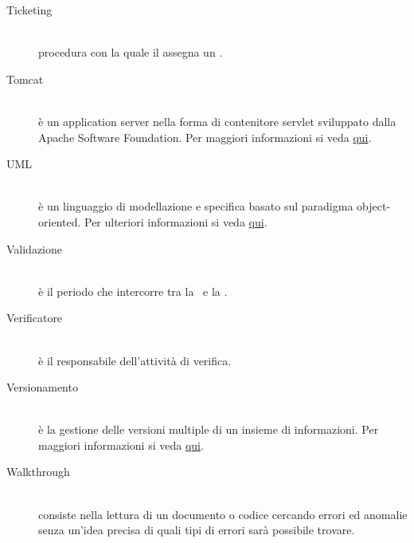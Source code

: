 \documentclass[12pt,a4paper]{article}
\begin{document}
\begin{description}
\item[Ticketing] 
\hfill\\procedura con la quale il \RE assegna un .

\item[Tomcat] 
\hfill\\è un application server nella forma di contenitore servlet  sviluppato dalla Apache Software Foundation. Per maggiori informazioni si veda \href{https://it.wikipedia.org/wiki/Apache_Tomcat}{qui}.

\item[UML] 
\hfill\\è un linguaggio di modellazione e specifica basato sul paradigma object-oriented. Per ulteriori informazioni si veda \href{http://it.wikipedia.org/wiki/Unified_Modeling_Language}{qui}.

\item[Validazione] 
\hfill\\è il periodo che intercorre tra la \RQ\ e la \RA.

\item[Verificatore] 
\hfill\\è il responsabile dell'attività di verifica.

\item[Versionamento] 
\hfill\\è la gestione delle versioni multiple di un insieme di informazioni. Per maggiori informazioni si veda \href{http://it. wikipedia.org/wiki/Controllo_versione}{qui}.

\item[Walkthrough] 
\hfill\\consiste nella lettura di un documento o codice cercando errori ed anomalie senza un'idea precisa di quali tipi di errori sarà possibile trovare.

\end{description}
\end{document}

